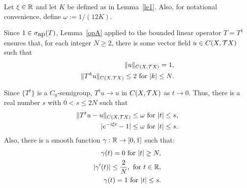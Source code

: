 \begin{pf}
Let $\xi\in{\Bbb{R}}$ and let $K$ be defined as in Lemma~\ref{le1}. Also,
for notational convenience,  define
$\omega:=1/(12K)$.

Since $1\in\sigma_{\mbox{ap}}(T)$,  Lemma~\ref{opA} applied to the bounded
linear operator $T=T^1$ ensures that, for each integer $N\geq 2$,
there is some vector field $u\in C(X,{{\cal{T}}X})$ such that
\begin{eqnarray}
\|u\|_{C(X,{{\cal{T}}X})}=1, \label{1a}\\
\|T^ku\|_{C(X,{{\cal{T}}X})}\leq 2 \mbox{ for } |k|\leq N. \label{1b}
\end{eqnarray}

Since $\{T^t\}$ is a $C_0$-semigroup, $T^tu\to u$ in
$C(X,{{\cal{T}}X})$ as $t\to 0$. Thus, there is a real number $s$ with
$0<s\le 2N$ such that
\begin{eqnarray}
\|T^tu-u\|_{C(X,{{\cal{T}}X})}\leq \omega \mbox{ for } |t|\leq s, \label{2}\\
| e^{-i\xi t} -1|\le\omega
\mbox{ for } |t|\leq s. \label{5cd}
\end{eqnarray}
Also, there is a smooth function $\gamma:{\Bbb{R}}\to [0,1]$ such that:
\begin{eqnarray}
\gamma(t)=0  \mbox{ for } |t|\geq N, \label{3a}\\
|\gamma'(t)|\leq{\displaystyle{2\over N}}, \mbox{ for } t\in{\Bbb{R}}, \label{3b}\\
\gamma (t)=1  \mbox{ for } |t|\leq s. \label{3c}
\end{eqnarray}


\end{pf}
